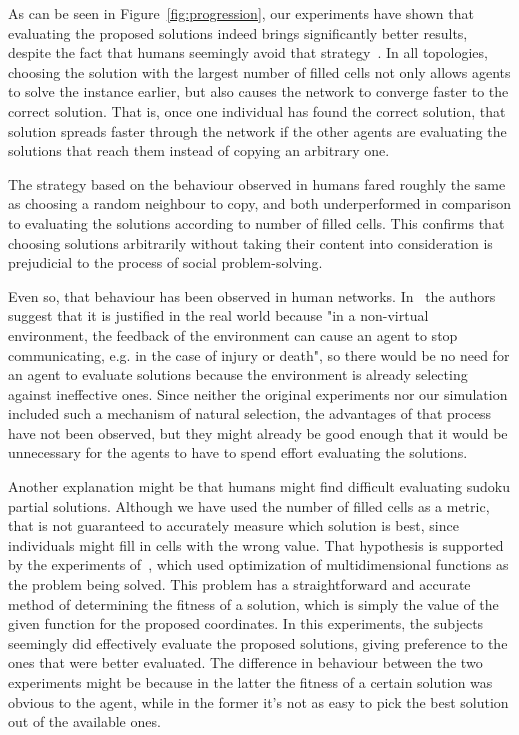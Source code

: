 \documentclass{article}
\begin{document}
As can be seen in Figure~\ref{fig:progression}, our experiments have shown that evaluating the proposed solutions indeed brings significantly better results, despite the fact that humans seemingly avoid that strategy~\cite{farenzena:collabem}. In all topologies, choosing the solution with the largest number of filled cells not only allows agents to solve the instance earlier, but also causes the network to converge faster to the correct solution. That is, once one individual has found the correct solution, that solution spreads faster through the network if the other agents are evaluating the solutions that reach them instead of copying an arbitrary one.

The strategy based on the behaviour observed in humans fared roughly the same as choosing a random neighbour to copy, and both underperformed in comparison to evaluating the solutions according to number of filled cells. This confirms that choosing solutions arbitrarily without taking their content into consideration is prejudicial to the process of social problem-solving.

Even so, that behaviour has been observed in human networks. In~\cite{farenzena:collabem} the authors suggest that it is justified in the real world because "in a non-virtual environment, the feedback of the environment can cause an agent to stop communicating, e.g. in the case of injury or death", so there would be no need for an agent to evaluate solutions because the environment is already selecting against ineffective ones. Since neither the original experiments nor our simulation included such a mechanism of natural selection, the advantages of that process have not been observed, but they might already be good enough that it would be unnecessary for the agents to have to spend effort evaluating the solutions.

Another explanation might be that humans might find difficult evaluating sudoku partial solutions. Although we have used the number of filled cells as a metric, that is not guaranteed to accurately measure which solution is best, since individuals might fill in cells with the wrong value. That hypothesis is supported by the experiments of~\cite{mason:collablearnet}, which used optimization of multidimensional functions as the problem being solved. This problem has a straightforward and accurate method of determining the fitness of a solution, which is simply the value of the given function for the proposed coordinates. In this experiments, the subjects seemingly did effectively evaluate the proposed solutions, giving preference to the ones that were better evaluated. The difference in behaviour between the two experiments might be because in the latter the fitness of a certain solution was obvious to the agent, while in the former it's not as easy to pick the best solution out of the available ones.
\end{document}
